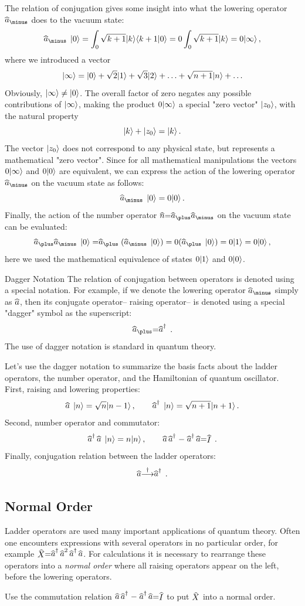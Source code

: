 The relation of conjugation gives some insight into what the lowering operator $\op{a}_\minus$ does to the vacuum state:
\[
\op{a}_\minus\,\ket{0}=\int_0  \sqrt{k+1}\ket{k}\braket{k+1}{0}=0\int_0\sqrt{k+1}\ket{k}=0\ket{\infty}\,,
\]
where we introduced a vector 
\[
|{\infty}\rangle=|{0}\rangle+\sqrt{2}|{1}\rangle+\sqrt{3}|{2}\rangle+\ldots+\sqrt{n+1}|{n}\rangle+\ldots
\]
Obviously, $|{\infty}\rangle\ne|{0}\rangle$. The overall factor of zero negates any possible contributions of $|{\infty}\rangle$, making the product $0|{\infty}\rangle$ a special "zero vector" $|{z_0}\rangle$, with the natural property
\[
|{k}\rangle+|{z_0}\rangle=|{k}\rangle\,.
\]
The vector $|{z_0}\rangle$ does not correspond to any physical state, but represents a mathematical "zero vector". Since for all mathematical manipulations the vectors $0|{\infty}\rangle$ and $0|{0}\rangle$ are equivalent,
we can express the action of the lowering operator $\op{a}_\minus$ on the vacuum state as follows:
\[
\op{a}_\minus\,\ket{0}=0\ket{0}\,.
\]
Finally, the action of the number operator $\op{n}=\op{a}_\plus\op{a}_\minus$ on the vacuum state can be evaluated:
\[
\op{a}_\plus\op{a}_\minus\,\ket{0}=\op{a}_\plus(\op{a}_\minus\,\ket{0})=0(\op{a}_\plus\,\ket{0})=0\ket{1}=0\ket{0}\,,
\]
here we used the mathematical equivalence of states $0|{1}\rangle$ and $0|{0}\rangle$.

\begin{mybio}{Dagger Notation}
	The relation of conjugation between operators is denoted using a special notation. For example, if we denote the lowering operator $\op{a}_\minus$ simply as $\op{a}$, then its conjugate operator-- raising operator-- is denoted using a special "dagger" symbol as the superscript:
	\[
	\op{a}_\plus = \op{a}^\dagger\,.
	\]
	The use of dagger notation is standard in quantum theory. 
	
	Let's use the dagger notation to summarize the basis facts about the ladder operators, the number operator, and the Hamiltonian of quantum oscillator.
	First, raising and lowering properties:
	\[
	\op{a}\,\ket{n}=\sqrt{n}\ket{n-1}\,,\qquad\op{a}^\dagger\,\ket{n}=\sqrt{n+1}\ket{n+1}\,.
	\]
	Second, number operator and commutator:
	\[
	\op{a}^\dagger\,\op{a}\,\ket{n}=n\ket{n}\,,\qquad \op{a}\,\op{a}^\dagger-\op{a}^\dagger\,\op{a}=\op{I}\,.
	\]
	Finally, conjugation relation between the ladder operators:
	\[
	\op{a}\overset{\dagger}{\longrightarrow}\op{a}^\dagger\,.
	\]
\end{mybio}
\subsection*{Normal Order}
\begin{exercise}
	Ladder operators are used many important applications of quantum theory. Often one encounters expressions with several operators in no particular order, for example $\op{X}=\op{a}^\dagger\,\op{a}^2\,\op{a}^\dagger\,\op{a}$. For calculations it is necessary to rearrange these operators into a \emph{normal order} where all raising operators appear on the left, before the lowering operators.
	
	Use the commutation relation $\op{a}\,\op{a}^\dagger-\op{a}^\dagger\,\op{a}=\op{I}$ to put $\op{X}$ into a normal order.
\end{exercise}


